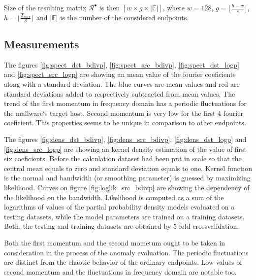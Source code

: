 \documentclass[a4paper,journal]{IEEEtran}
\begin{document}
Size of the resulting matrix $\mathcal{R}^\bullet$ is then
$[w\times g\times \lvert\mathbb{E}\rvert]$, where $w=128$, $g=\lfloor\frac{h-w}{s} \rfloor$, 
$h = \lfloor\frac{T_{max}}{\delta}\rfloor$ and $\lvert\mathbb{E}\rvert $ is the number of the 
considered endpoints.

\subsection{Measurements}
The figures \ref{fig:spect_dst_bdivp},
\ref{fig:spect_src_bdivp}, \ref{fig:spect_dst_logp} and \ref{fig:spect_src_logp} are 
showing an mean value of the fourier coeficients along with a standard deviation.
The blue curves are mean values and red are standard deviations added to respectively 
subtracted from mean values. 
The trend of the first momentum in frequency domain has a periodic fluctuations
for the mallware`s target host. Second momentum is
very low for the first 4 fourier coeficient. This properties seems to be unique in 
comparison to other endpoints.


The figures \ref{fig:dens_dst_bdivp}, \ref{fig:dens_src_bdivp},
\ref{fig:dens_dst_logp} and \ref{fig:dens_src_logp} are showing
an kernel density estimation of the value of first six coeficients.
Before the calculation dataset had been put in scale so that the
central mean equals to zero and standard deviation equals to one.
Kernel function is the normal and bandwidth (or smoothing parameter)
is guessed by maximizing likelihood. 
Curves on figure \ref{fig:loglik_src_bdivp} are showing
the dependency of the likelihood on the bandwidth. 
Likelihood is computed as a sum of the logarithms of values of the
partial probability density models evaluated on a testing datasets,
while the model parameters are trained on a training datasets. 
Both, the testing and training datasets are obtained by 5-fold
crossvalidation.

Both the first momentum and the second mometum ought to be taken in
consideration in the process of the anomaly evaluation.
The periodic fluctuations are distinct from the
chaotic behavior of the ordinary endpoints. Low values of second
momentum and the fluctuations in frequency domain are notable too.
\end{document}
